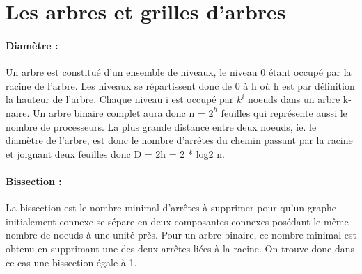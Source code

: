 \section{Les arbres et grilles d'arbres}

\paragraph{Diamètre : } Un arbre est constitué d'un ensemble de niveaux, le niveau 0 étant occupé par la racine de l'arbre.
Les niveaux se répartissent donc de 0 à h où h est par définition la hauteur de l'arbre. Chaque niveau i est occupé 
par $k^{i}$  noeuds dans un arbre k-naire. Un arbre binaire complet aura donc n = $2^{h}$ feuilles qui représente aussi le nombre de processeurs. 
La plus grande distance entre deux noeuds, ie. le diamètre de l'arbre, est donc le nombre d'arrêtes du chemin passant par la racine et joignant deux feuilles donc D = 2h = 2 * log2 n. 


\paragraph{Bissection : } La bissection est le nombre minimal d'arrêtes à supprimer pour qu'un graphe initialement
connexe se sépare en deux composantes connexes posédant le même nombre de noeuds à une unité près.
Pour un arbre binaire, ce nombre minimal est obtenu en supprimant une des deux arrêtes liées à la racine. On trouve
donc dans ce cas une bissection égale à 1.